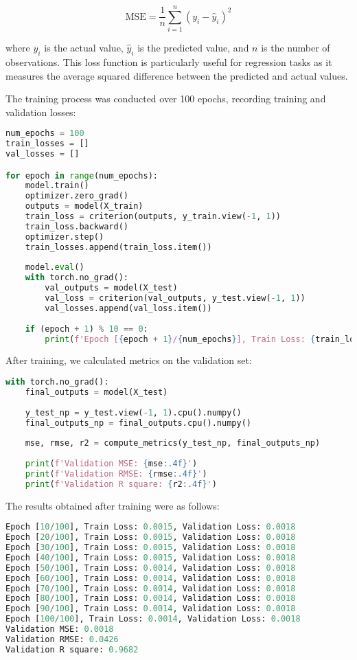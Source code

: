 \documentclass{article}
\begin{document}
\begin{center}
\[
\text{MSE} = \frac{1}{n} \sum_{i=1}^{n} (y_i - \hat{y}_i)^2
\]
\end{center}

where \(y_i\) is the actual value, \(\hat{y}_i\) is the predicted value, and \(n\) is the number of observations. This loss function is particularly useful for regression tasks as it measures the average squared difference between the predicted and actual values.

The training process was conducted over 100 epochs, recording training and validation losses:

\begin{lstlisting}[language=Python,]
num_epochs = 100
train_losses = []
val_losses = []

for epoch in range(num_epochs):
    model.train()
    optimizer.zero_grad()
    outputs = model(X_train)
    train_loss = criterion(outputs, y_train.view(-1, 1))
    train_loss.backward()
    optimizer.step()
    train_losses.append(train_loss.item())
    
    model.eval()
    with torch.no_grad():
        val_outputs = model(X_test)
        val_loss = criterion(val_outputs, y_test.view(-1, 1))
        val_losses.append(val_loss.item())
        
    if (epoch + 1) % 10 == 0:
        print(f'Epoch [{epoch + 1}/{num_epochs}], Train Loss: {train_loss.item():.4f}, Validation Loss: {val_loss.item():.4f}')
\end{lstlisting}

After training, we calculated metrics on the validation set:

\begin{lstlisting}[language=Python,]
with torch.no_grad():
    final_outputs = model(X_test)
    
    y_test_np = y_test.view(-1, 1).cpu().numpy()
    final_outputs_np = final_outputs.cpu().numpy()
    
    mse, rmse, r2 = compute_metrics(y_test_np, final_outputs_np)
    
    print(f'Validation MSE: {mse:.4f}')
    print(f'Validation RMSE: {rmse:.4f}')
    print(f'Validation R square: {r2:.4f}')
\end{lstlisting}

The results obtained after training were as follows:

\begin{lstlisting}[language=Python,]
Epoch [10/100], Train Loss: 0.0015, Validation Loss: 0.0018
Epoch [20/100], Train Loss: 0.0015, Validation Loss: 0.0018
Epoch [30/100], Train Loss: 0.0015, Validation Loss: 0.0018
Epoch [40/100], Train Loss: 0.0015, Validation Loss: 0.0018
Epoch [50/100], Train Loss: 0.0014, Validation Loss: 0.0018
Epoch [60/100], Train Loss: 0.0014, Validation Loss: 0.0018
Epoch [70/100], Train Loss: 0.0014, Validation Loss: 0.0018
Epoch [80/100], Train Loss: 0.0014, Validation Loss: 0.0018
Epoch [90/100], Train Loss: 0.0014, Validation Loss: 0.0018
Epoch [100/100], Train Loss: 0.0014, Validation Loss: 0.0018
Validation MSE: 0.0018
Validation RMSE: 0.0426
Validation R square: 0.9682
\end{lstlisting}
\newpage
\end{document}
